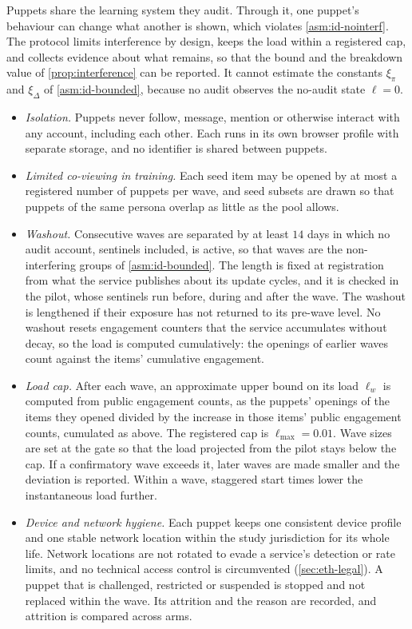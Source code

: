 Puppets share the learning system they audit. Through it, one puppet's behaviour can change what another is shown, which violates \cref{asm:id-nointerf}. The protocol limits interference by design, keeps the load within a registered cap, and collects evidence about what remains, so that the bound and the breakdown value of \cref{prop:interference} can be reported. It cannot estimate the constants $\xi_\pi$ and $\xi_\Delta$ of \cref{asm:id-bounded}, because no audit observes the no-audit state $\ell=0$.
\begin{itemize}
  \item \emph{Isolation.} Puppets never follow, message, mention or otherwise interact with any account, including each other. Each runs in its own browser profile with separate storage, and no identifier is shared between puppets.
  \item \emph{Limited co-viewing in training.} Each seed item may be opened by at most a registered number of puppets per wave, and seed subsets are drawn so that puppets of the same persona overlap as little as the pool allows.
  \item \emph{Washout.} Consecutive waves are separated by at least $14$ days in which no audit account, sentinels included, is active, so that waves are the non-interfering groups of \cref{asm:id-bounded}. The length is fixed at registration from what the service publishes about its update cycles, and it is checked in the pilot, whose sentinels run before, during and after the wave. The washout is lengthened if their exposure has not returned to its pre-wave level. No washout resets engagement counters that the service accumulates without decay, so the load is computed cumulatively: the openings of earlier waves count against the items' cumulative engagement.
  \item \emph{Load cap.} After each wave, an approximate upper bound on its load $\ell_w$ is computed from public engagement counts, as the puppets' openings of the items they opened divided by the increase in those items' public engagement counts, cumulated as above. The registered cap is $\ell_{\max}=0.01$. Wave sizes are set at the gate so that the load projected from the pilot stays below the cap. If a confirmatory wave exceeds it, later waves are made smaller and the deviation is reported. Within a wave, staggered start times lower the instantaneous load further.
  \item \emph{Device and network hygiene.} Each puppet keeps one consistent device profile and one stable network location within the study jurisdiction for its whole life. Network locations are not rotated to evade a service's detection or rate limits, and no technical access control is circumvented (\cref{sec:eth-legal}). A puppet that is challenged, restricted or suspended is stopped and not replaced within the wave. Its attrition and the reason are recorded, and attrition is compared across arms.

\end{itemize}

